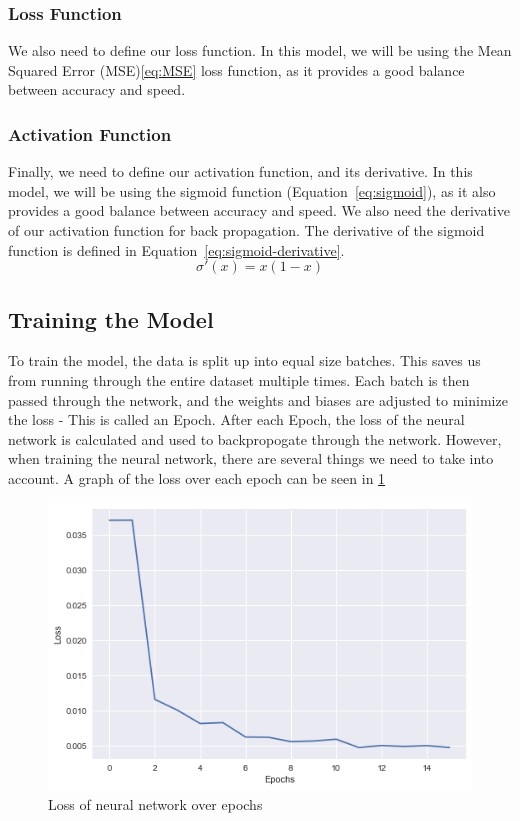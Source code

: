 \documentclass[titlepage]{article}
\begin{document}
\subsubsection{Loss Function}
We also need to define our loss function. In this model, we will be using the Mean Squared Error (MSE)\ref{eq:MSE} loss function, as it provides a good balance between accuracy and speed.
\subsubsection{Activation Function}
Finally, we need to define our activation function, and its derivative. In this model, we will be using the sigmoid function (Equation~\ref{eq:sigmoid}), as it also provides a good balance between accuracy and speed. We also need the derivative of our activation function for back propagation. The derivative of the sigmoid function is defined in Equation~\ref{eq:sigmoid-derivative}.
\begin{equation}
    \sigma'(x) = x(1-x)
    \label{eq:sigmoid-derivative}
\end{equation}


\subsection{Training the Model}
To train the model, the data is split up into equal size batches. This saves us from running through the entire dataset multiple times. Each batch is then passed through the network, and the weights and biases are adjusted to minimize the loss - This is called an Epoch. After each Epoch, the loss of the neural network is calculated and used to backpropogate through the network. However, when training the neural network, there are several things we need to take into account. A graph of the loss over each epoch can be seen in \ref{fig:loss}
\begin{figure}[h!]
    \includegraphics[width=\linewidth]{assets/loss.png}
    \caption{Loss of neural network over epochs}
    \label{fig:loss}
\end{figure}
\end{document}
